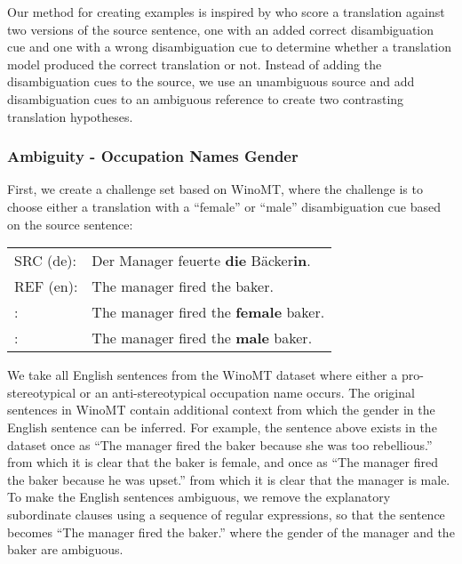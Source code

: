 \documentclass[11pt]{article}
\newcommand{\cmark}{\textcolor{darkpastelgreen}{\ding{51}}}\newcommand{\xmark}{\textcolor{darkpastelred}{\ding{55}}}
\begin{document}
Our method for creating examples is inspired by \citet{vamvas-sennrich-2021-contrastive} who score a translation against two versions of the source sentence, one with an added correct disambiguation cue and one with a wrong disambiguation cue to determine whether a translation model produced the correct translation or not. Instead of adding the disambiguation cues to the source, we use an unambiguous source and add disambiguation cues to an ambiguous reference to create two contrasting translation hypotheses.

\subsubsection{Ambiguity - Occupation Names Gender}
\label{subsec:gender_in_occupation_names}
First, we create a challenge set based on WinoMT, where the challenge is to choose either a translation with a ``female'' or ``male'' disambiguation cue based on the source sentence:

\begin{small}
\vspace{0.5cm}
\setlength{\extrarowheight}{0.1cm}
\begin{tabular}{ll}
     SRC (de): &  Der Manager feuerte \textbf{die} Bäcker\textbf{in}. \\
     REF (en): & The manager fired the baker. \\
     \cmark: & The manager fired the \textbf{female} baker. \\
     \xmark: & The manager fired the \textbf{male} baker. \vspace{0.35cm}
\end{tabular}
\end{small}

We take all English sentences from the WinoMT dataset where either a pro-stereotypical or an anti-stereotypical occupation name occurs. The original sentences in WinoMT contain additional context from which the gender in the English sentence can be inferred. For example, the sentence above exists in the dataset once as ``The manager fired the baker because she was too rebellious.'' from which it is clear that the baker is female, and once as ``The manager fired the baker because he was upset.'' from which it is clear that the manager is male. To make the English sentences ambiguous, we remove the explanatory subordinate clauses using a sequence of regular expressions, so that the sentence becomes ``The manager fired the baker.'' where the gender of the manager and the baker are ambiguous.
\end{document}
